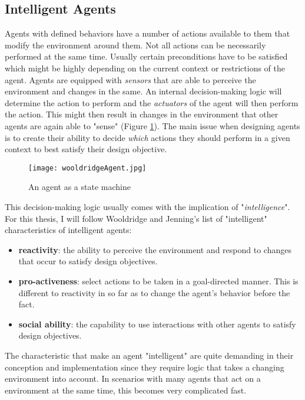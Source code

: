 \subsection{Intelligent Agents}
Agents with defined behaviors have a number of actions available to them that modify the environment around them. Not all actions can be necessarily performed at the same time. Usually certain preconditions have to be satisfied which might be highly depending on the current context or restrictions of the agent. Agents are equipped with \textit{sensors} that are able to perceive the environment and changes in the same. An internal decision-making logic will determine the action to perform and the \textit{actuators} of the agent will then perform the action. This might then result in changes in the environment that other agents are again able to "sense" (Figure \ref{fig:wooldridgeAgent}). The main issue when designing agents is to create their ability to decide \textit{which} actions they should perform in a given context to best satisfy their design objective.~\cite{Wooldridge2009}\\
\begin{figure}
	\centering
	\texttt{[image: wooldridgeAgent.jpg]}
	\caption{An agent as a state machine~\cite{Wooldridge2009}}
	\label{fig:wooldridgeAgent}
\end{figure}
This decision-making logic usually comes with the implication of "\textit{intelligence}". For this thesis, I will follow Wooldridge and Jenning's list of "intelligent" characteristics of intelligent agents:
\begin{itemize}
	\item \textbf{reactivity}: the ability to perceive the environment and respond to changes that occur to satisfy design objectives.
	\item \textbf{pro-activeness}: select actions to be taken in a goal-directed manner. This is different to reactivity in so far as to change the agent's behavior before the fact.
	\item \textbf{social ability}: the capability to use interactions with other agents to satisfy design objectives.
\end{itemize}
The characteristic that make an agent "intelligent" are quite demanding in their conception and implementation since they require logic that takes a changing environment into account. In scenarios with many agents that act on a environment at the same time, this becomes very complicated fast.~\cite{Wooldridge1995}
